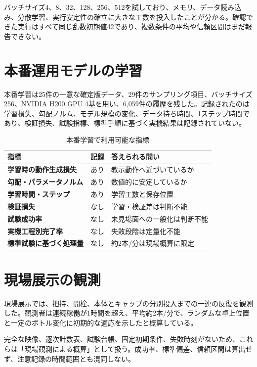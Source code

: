 バッチサイズ4、8、32、128、256、512を試しており、メモリ、データ読み込み、分散学習、実行安定性の確立に大きな工数を投入したことが分かる。確認できた実行はすべて同じ乱数初期値42であり、複数条件の平均や信頼区間はまだ報告できない。

\section{本番運用モデルの学習}

本番学習は25件の一意な確定版データ、29件のサンプリング項目、バッチサイズ256、NVIDIA H200 GPU 4基を用い、6,059件の履歴を残した。記録されたのは学習損失、勾配ノルム、モデル規模の変化、データ待ち時間、1ステップ時間であり、検証損失、試験指標、標準手順に基づく実機結果は記録されていない。

\begin{table}[H]
\centering
\caption{本番学習で利用可能な指標}
\begin{tabularx}{\textwidth}{>{\bfseries}p{38mm}p{24mm}X}
\toprule
指標 & 記録 & 答えられる問い\\
\midrule
学習時の動作生成損失 & あり & 教示動作へ近づいているか\\
勾配・パラメータノルム & あり & 数値的に安定しているか\\
学習時間・ステップ & あり & 学習工数と保存位置\\
検証損失 & なし & 学習・検証差は判断不能\\
試験成功率 & なし & 未見場面への一般化は判断不能\\
実機工程別完了率 & なし & 失敗段階は定量化不能\\
標準試験に基づく処理量 & なし & 約2本/分は現場概算に限定\\
\bottomrule
\end{tabularx}
\end{table}

\section{現場展示の観測}

現場展示では、把持、開栓、本体とキャップの分別投入までの一連の反復を観測した。観測者は連続稼働が1時間を超え、平均約2本/分で、ランダムな卓上位置と一定のボトル変化に初期的な適応を示したと概算している。

完全な映像、逐次計数表、試験台帳、固定初期条件、失敗時刻がないため、これらは「現場観測による概算」として扱う。成功率、標準偏差、信頼区間は算出せず、注意記録の時間範囲とも混同しない。


